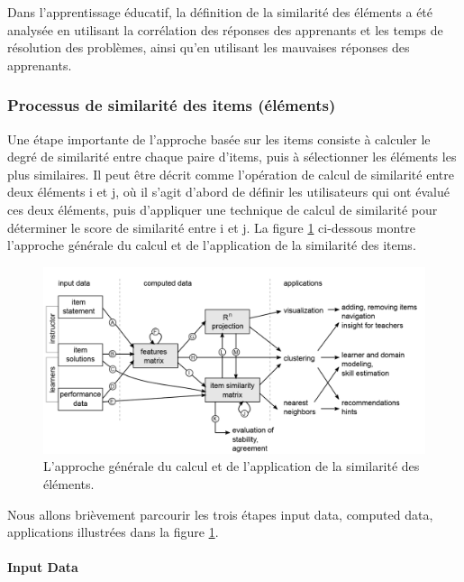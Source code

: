 Dans l'apprentissage éducatif, la définition de la similarité des éléments a été analysée en utilisant la corrélation des réponses des apprenants et les temps de résolution des problèmes, ainsi qu'en utilisant les mauvaises réponses des apprenants. \cite{pelanek2018measuring}

\subsubsection{Processus de similarité des items (éléments)}
Une étape importante de l'approche basée sur les items consiste à calculer le degré de similarité entre chaque paire d’items, puis à sélectionner les éléments les plus similaires. Il peut être décrit comme l'opération de calcul de similarité entre deux éléments i et j, où il s'agit d'abord de définir les utilisateurs qui ont évalué ces deux éléments, puis d'appliquer une technique de calcul de similarité pour déterminer le score de similarité entre i et j. \cite{item_based_recommendation_algo} La figure \ref{calcul_application_similarity} ci-dessous montre l'approche générale du calcul et de l'application de la similarité des items.

\begin{figure}[H]
	\begin{center}
		\includegraphics[width=\textwidth]{images/chapitre3/calcul_application_similarity.png}
	\end{center}
\caption{L'approche générale du calcul et de l'application de la similarité des éléments.}
\label{calcul_application_similarity}
\end{figure}

Nous allons brièvement parcourir les trois étapes input data, computed data, applications illustrées dans la figure \ref{calcul_application_similarity}. 
\paragraph{Input Data}

